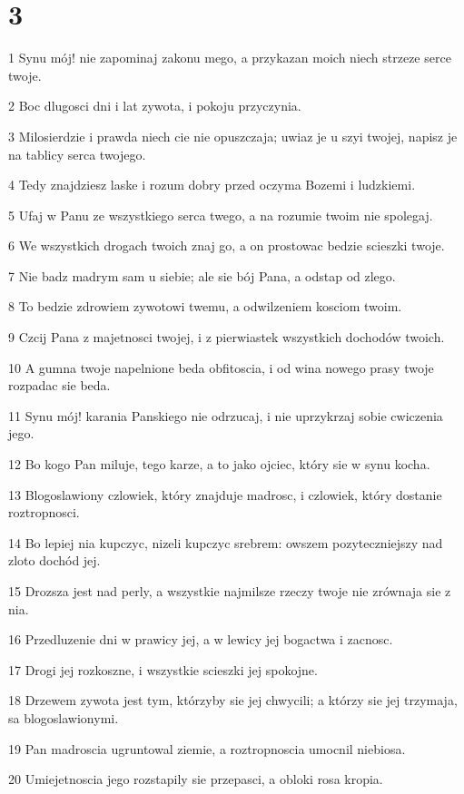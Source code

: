 \chapter{3}

\par 1 Synu mój! nie zapominaj zakonu mego, a przykazan moich niech strzeze serce twoje.
\par 2 Boc dlugosci dni i lat zywota, i pokoju przyczynia.
\par 3 Milosierdzie i prawda niech cie nie opuszczaja; uwiaz je u szyi twojej, napisz je na tablicy serca twojego.
\par 4 Tedy znajdziesz laske i rozum dobry przed oczyma Bozemi i ludzkiemi.
\par 5 Ufaj w Panu ze wszystkiego serca twego, a na rozumie twoim nie spolegaj.
\par 6 We wszystkich drogach twoich znaj go, a on prostowac bedzie scieszki twoje.
\par 7 Nie badz madrym sam u siebie; ale sie bój Pana, a odstap od zlego.
\par 8 To bedzie zdrowiem zywotowi twemu, a odwilzeniem kosciom twoim.
\par 9 Czcij Pana z majetnosci twojej, i z pierwiastek wszystkich dochodów twoich.
\par 10 A gumna twoje napelnione beda obfitoscia, i od wina nowego prasy twoje rozpadac sie beda.
\par 11 Synu mój! karania Panskiego nie odrzucaj, i nie uprzykrzaj sobie cwiczenia jego.
\par 12 Bo kogo Pan miluje, tego karze, a to jako ojciec, który sie w synu kocha.
\par 13 Blogoslawiony czlowiek, który znajduje madrosc, i czlowiek, który dostanie roztropnosci.
\par 14 Bo lepiej nia kupczyc, nizeli kupczyc srebrem: owszem pozyteczniejszy nad zloto dochód jej.
\par 15 Drozsza jest nad perly, a wszystkie najmilsze rzeczy twoje nie zrównaja sie z nia.
\par 16 Przedluzenie dni w prawicy jej, a w lewicy jej bogactwa i zacnosc.
\par 17 Drogi jej rozkoszne, i wszystkie scieszki jej spokojne.
\par 18 Drzewem zywota jest tym, którzyby sie jej chwycili; a którzy sie jej trzymaja, sa blogoslawionymi.
\par 19 Pan madroscia ugruntowal ziemie, a roztropnoscia umocnil niebiosa.
\par 20 Umiejetnoscia jego rozstapily sie przepasci, a obloki rosa kropia.
